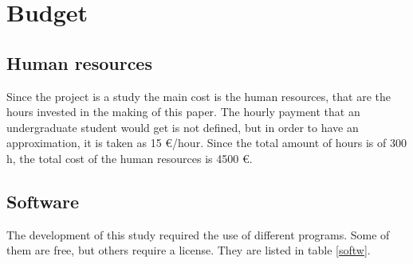 
\setlength{\parindent}{0pt}

\usepackage{epigraph}
\usepackage{tocloft}
\usepackage{mathcomp}
\usepackage{subcaption}

\usepackage{multicol}
\usepackage[T1]{fontenc}
\usepackage{titlesec, blindtext, color}
\newcommand{\hsp}{\hspace{20pt}}
\titleformat{\chapter}[hang]{\Huge\bfseries}{\thechapter\hsp\textcolor{gray75}{|}\hsp}{0pt}{\Huge\bfseries}


\renewcommand{\familydefault}{\sfdefault}



\newpage\thispagestyle{EmptyPage}


\setcounter{tocdepth}{3}
\tableofcontents
\pagebreak

\renewcommand{\cfttabnumwidth}{4em}
\listoftables
\pagebreak


\newpage
{}

\newpage
\setlength{\parskip}{1em}

\chapter{Budget}

\section{Human resources}
Since the project is a study the main cost is the human resources, that are the hours invested in the making of this paper. The hourly payment that an undergraduate student would get is not defined, but in order to have an approximation, it is taken as 15 €/hour. Since the total amount of hours is of 300 h, the total cost of the human resources is 4500 €.

\section{Software}
The development of this study required the use of different programs. Some of them are free, but others require a license. They are listed in table \ref{softw}.

